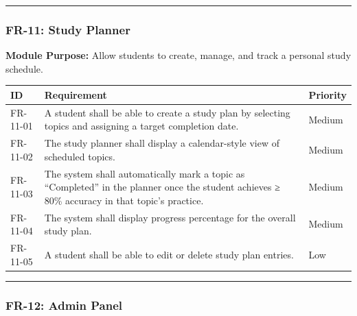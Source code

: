 \documentclass[
]{article}
\begin{document}
\begin{center}\rule{0.5\linewidth}{0.5pt}\end{center}

\subsubsection{FR-11: Study Planner}\label{fr-11-study-planner}

\textbf{Module Purpose:} Allow students to create, manage, and track a
personal study schedule.

\begin{longtable}[]{@{}
  >{\raggedright\arraybackslash}p{}
  >{\raggedright\arraybackslash}p{}
  >{\raggedright\arraybackslash}p{}@{}}
\toprule\noalign{}
\begin{minipage}[b]{\linewidth}\raggedright
ID
\end{minipage} & \begin{minipage}[b]{\linewidth}\raggedright
Requirement
\end{minipage} & \begin{minipage}[b]{\linewidth}\raggedright
Priority
\end{minipage} \\
\midrule\noalign{}
\endhead
\bottomrule\noalign{}
\endlastfoot
FR-11-01 & A student shall be able to create a study plan by selecting
topics and assigning a target completion date. & Medium \\
FR-11-02 & The study planner shall display a calendar-style view of
scheduled topics. & Medium \\
FR-11-03 & The system shall automatically mark a topic as ``Completed''
in the planner once the student achieves ≥ 80\% accuracy in that topic's
practice. & Medium \\
FR-11-04 & The system shall display progress percentage for the overall
study plan. & Medium \\
FR-11-05 & A student shall be able to edit or delete study plan entries.
& Low \\
\end{longtable}

\begin{center}\rule{0.5\linewidth}{0.5pt}\end{center}

\subsubsection{FR-12: Admin Panel}\label{fr-12-admin-panel}
\end{document}
